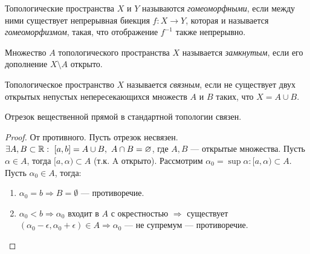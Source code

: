 \begin{definition}
    Топологические пространства $X$ и $Y$ называются \textit{гомеоморфными}, если между ними существует непрерывная биекция $f: X \to Y$, которая и называется \textit{гомеоморфизмом}, такая, что отображение $f^{-1}$ также непрерывно.
\end{definition}

\begin{definition}
    Множество $A$ топологического пространства $X$ называется \textit{замкнутым}, если его дополнение $X \setminus A$ открыто.
\end{definition}

\begin{definition}
    Топологическое пространство $X$ называется \textit{связным}, если не существует двух открытых непустых непересекающихся множеств $A$ и $B$ таких, что $X = A \cup B$.
\end{definition}

\begin{statement}
    Отрезок вещественной прямой в стандартной топологии связен.
\end{statement}
\begin{proof}
    От противного. Пусть отрезок несвязен. $\exists A, B \subset \mathbb{R}: \ [a, b] = A \cup B, \ A \cap B = \varnothing$, где $A, B$ — открытые множества. Пусть $\alpha \in A$, тогда $[a, \alpha) \subset A$ (т.к. A открыто). Рассмотрим $\alpha_0 = \sup{\alpha}: [a, \alpha) \subset A$. \\
    Пусть $\alpha_0 \in A$, тогда:
    \begin{enumerate}
        \item $\alpha_0 = b \Rightarrow B = \emptyset$ — противоречие.
        \item $\alpha_0 < b \Rightarrow \alpha_0$ входит в $A$ с окрестностью $\Rightarrow$ существует $(\alpha_0 - \epsilon, \alpha_0 + \epsilon) \in A \Rightarrow \alpha_0$ — не супремум — противоречие.
    \end{enumerate}
\end{proof}

